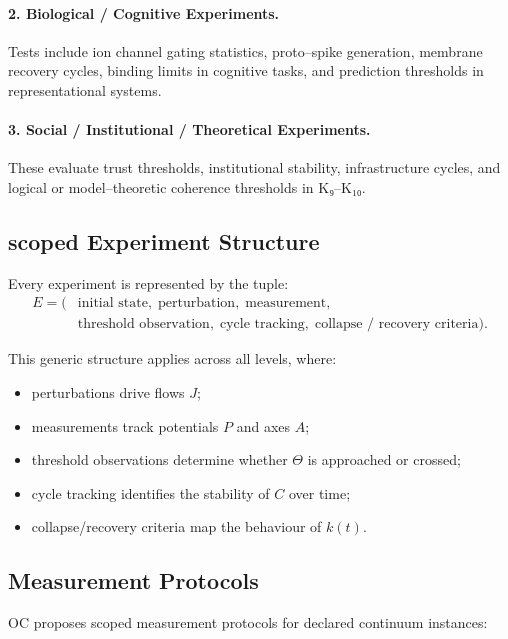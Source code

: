 \paragraph{2. Biological / Cognitive Experiments.}  
Tests include ion channel gating statistics, proto–spike generation,
membrane recovery cycles, binding limits in cognitive tasks, and prediction
thresholds in representational systems.

\paragraph{3. Social / Institutional / Theoretical Experiments.}  
These evaluate trust thresholds, institutional stability, infrastructure
cycles, and logical or model–theoretic coherence thresholds in K₉–K₁₀.


\subsection{scoped Experiment Structure}

Every experiment is represented by the tuple:
\[
\begin{aligned}
   E = (&\text{initial state},\;
         \text{perturbation},\;
         \text{measurement},\\
        &\text{threshold observation},\;
         \text{cycle tracking},\;
         \text{collapse / recovery criteria}).
\end{aligned}
\]

This generic structure applies across all levels, where:

\begin{itemize}
    \item perturbations drive flows $J$;
    \item measurements track potentials $P$ and axes $A$;
    \item threshold observations determine whether $\Theta$ is approached or
          crossed;
    \item cycle tracking identifies the stability of $C$ over time;
    \item collapse/recovery criteria map the behaviour of $k(t)$.
\end{itemize}


\subsection{Measurement Protocols}

OC proposes scoped measurement protocols for declared continuum instances:

